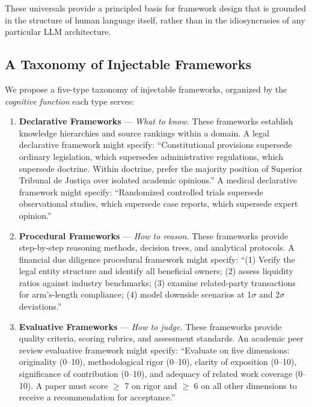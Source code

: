 \documentclass[12pt,a4paper]{article}
\begin{document}
These universals provide a principled basis for framework design that is grounded in the structure of human language itself, rather than in the idiosyncrasies of any particular LLM architecture.

\subsection{A Taxonomy of Injectable Frameworks}
\label{sec:definition:taxonomy}

We propose a five-type taxonomy of injectable frameworks, organized by the \emph{cognitive function} each type serves:

\begin{enumerate}[label=\textbf{Type \arabic*}.]
    \item \textbf{Declarative Frameworks} --- \emph{What to know.} These frameworks establish knowledge hierarchies and source rankings within a domain. A legal declarative framework might specify: ``Constitutional provisions supersede ordinary legislation, which supersedes administrative regulations, which supersede doctrine. Within doctrine, prefer the majority position of Superior Tribunal de Justi\c{c}a over isolated academic opinions.'' A medical declarative framework might specify: ``Randomized controlled trials supersede observational studies, which supersede case reports, which supersede expert opinion.''

    \item \textbf{Procedural Frameworks} --- \emph{How to reason.} These frameworks provide step-by-step reasoning methods, decision trees, and analytical protocols. A financial due diligence procedural framework might specify: ``(1) Verify the legal entity structure and identify all beneficial owners; (2) assess liquidity ratios against industry benchmarks; (3) examine related-party transactions for arm's-length compliance; (4) model downside scenarios at 1$\sigma$ and 2$\sigma$ deviations.''

    \item \textbf{Evaluative Frameworks} --- \emph{How to judge.} These frameworks provide quality criteria, scoring rubrics, and assessment standards. An academic peer review evaluative framework might specify: ``Evaluate on five dimensions: originality (0--10), methodological rigor (0--10), clarity of exposition (0--10), significance of contribution (0--10), and adequacy of related work coverage (0--10). A paper must score $\geq$ 7 on rigor and $\geq$ 6 on all other dimensions to receive a recommendation for acceptance.''


\end{enumerate}
\end{document}
